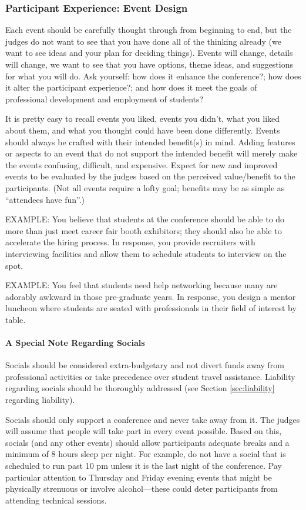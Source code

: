 \documentclass[12pt]{article}
\begin{document}
\subsubsection{Participant Experience: Event Design}
Each event should be carefully thought through from beginning to end, but the judges do not want to see that you have done all of the thinking already (we want to see ideas and your plan for deciding things). Events will change, details will change, we want to see that you have options, theme ideas, and suggestions for what you will do. Ask yourself: how does it enhance the conference?; how does it alter the participant experience?; and how does it meet the goals of professional development and employment of students?

It is pretty easy to recall events you liked, events you didn’t, what you liked about them, and what you thought could have been done differently. Events should always be crafted with their intended benefit(s) in mind. Adding features or aspects to an event that do not support the intended benefit will merely make the events confusing, difficult, and expensive. Expect for new and improved events to be evaluated by the judges based on the perceived value/benefit to the participants. (Not all events require a lofty goal; benefits may be as simple as “attendees have fun”.)

EXAMPLE: You believe that students at the conference should be able to do more than just meet career fair booth exhibitors; they should also be able to accelerate the hiring process. In response, you provide recruiters with interviewing facilities and allow them to schedule students to interview on the spot.

EXAMPLE: You feel that students need help networking because many are adorably awkward in those pre-graduate years. In response, you design a mentor luncheon where students are seated with professionals in their field of interest by table.

\paragraph{A Special Note Regarding Socials}
Socials should be considered extra-budgetary and not divert funds away from professional activities or take precedence over student travel assistance. Liability regarding socials should be thoroughly addressed (see Section \ref{sec:liability} regarding liability).

Socials should only support a conference and never take away from it. The judges will assume that people will take part in every event possible. Based on this, socials (and any other events) should allow participants adequate breaks and a minimum of 8 hours sleep per night. For example, do not have a social that is scheduled to run past 10 pm unless it is the last night of the conference. Pay particular attention to Thursday and Friday evening events that might be physically strenuous or involve alcohol---these could deter participants from attending technical sessions.
\end{document}
